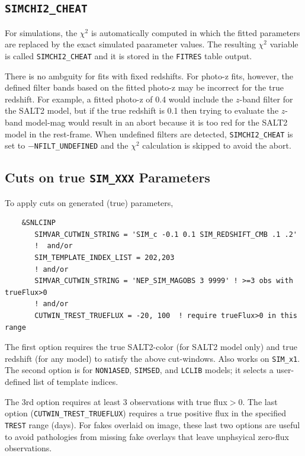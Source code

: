 \documentclass[12pt]{article}
\begin{document}

\subsection{{\tt SIMCHI2\_CHEAT} }
\label{subsec:simchi2_chear}

For simulations, the $\chi^2$ is automatically computed
in which the fitted parameters are replaced by the 
exact simulated paarameter values. The resulting $\chi^2$ variable
is called {\tt SIMCHI2\_CHEAT} and it is stored in the 
{\tt FITRES} table output.

There is no ambguity for fits with fixed redshifts.
For photo-z fits, however, the defined filter bands based
on the fitted photo-z may be incorrect for the true redshift.
For example, a fitted photo-z of 0.4 would include the
$z$-band filter for the SALT2 model, 
but if the true redshift is 0.1 then trying to evaluate
the $z$-band model-mag would result in an abort because
it is too red for the SALT2 model in the rest-frame.
When undefined filters are detected,
{\tt SIMCHI2\_CHEAT}  is set to $-${\tt NFILT\_UNDEFINED}
and the $\chi^2$ calculation is skipped to avoid the abort.


\subsection{Cuts on true {\tt SIM\_XXX} Parameters}
\label{subsec:SIMVAR_CUTS}

To apply cuts on generated (true) parameters,
\begin{verbatim}
    &SNLCINP
       SIMVAR_CUTWIN_STRING = 'SIM_c -0.1 0.1 SIM_REDSHIFT_CMB .1 .2'
       !  and/or
       SIM_TEMPLATE_INDEX_LIST = 202,203
       ! and/or
       SIMVAR_CUTWIN_STRING = 'NEP_SIM_MAGOBS 3 9999' ! >=3 obs with trueFlux>0
       ! and/or
       CUTWIN_TREST_TRUEFLUX = -20, 100  ! require trueFlux>0 in this range

\end{verbatim}
%
The first option requires the true SALT2-color (for SALT2 model only)
and true redshift (for any model) to satisfy
the above cut-windows.  Also works on {\tt SIM\_x1}.
The second option is for {\tt NON1ASED}, {\tt SIMSED}, and {\tt LCLIB}
models; it selects a user-defined list of template indices.

The 3rd option requires at least 3 observations with true flux$>0$.
The last option ({\tt CUTWIN\_TREST\_TRUEFLUX}) requires
a true positive flux in the specified {\tt TREST} range (days).
For fakes overlaid on image,  these last two options are useful 
to avoid pathologies from missing fake overlays that leave 
unphsyical zero-flux observations.
\end{document}
